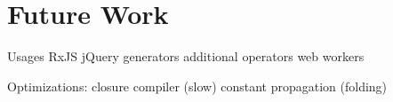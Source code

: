 \chapter{Future Work}

Usages
RxJS
jQuery
generators
additional operators
web workers

Optimizations:
closure compiler (slow)
constant propagation (folding)